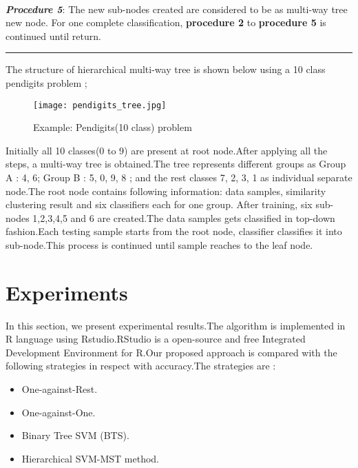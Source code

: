 \documentclass[a4paper, 10pt, conference]{ieeeconf}      %
\begin{document}
\newline \\
\textit{\textbf{Procedure 5}}: The new sub-nodes created are considered to be as multi-way tree new node. For one complete classification, \textbf{procedure 2} to \textbf{procedure 5} is continued until return.
\newline
\hrule
\vspace{0.2cm}
The structure of hierarchical multi-way tree is shown below using a 10 class pendigits problem ;
\begin{figure}[h!] 
\hspace{0.2cm}\texttt{[image: pendigits\_tree.jpg]}
\caption{Example: Pendigits(10 class) problem}  
\end{figure}
\par
Initially all 10 classes(0 to 9) are present at root node.After applying all the steps, a multi-way tree is obtained.The tree represents different groups as Group A : 4, 6; Group B : 5, 0, 9, 8 ; and the rest classes 7, 2, 3, 1 as individual separate node.The root node contains following information: data samples, similarity clustering result and six classifiers each for one group. After training, six sub-nodes 1,2,3,4,5 and 6 are created.The data samples gets classified in top-down fashion.Each testing sample starts from the root node, classifier classifies it into sub-node.This process is continued until sample reaches to the leaf node.

\section{Experiments}

In this section, we present experimental results.The algorithm is implemented in
R language using Rstudio.RStudio is a open-source and free Integrated Development Environment for R.Our proposed approach is compared with the following strategies in respect with accuracy.The strategies are :
\begin{itemize}
\item One-against-Rest.
\item One-against-One.
\item Binary Tree SVM (BTS).
\item Hierarchical SVM-MST method.
\end{itemize}
\end{document}
